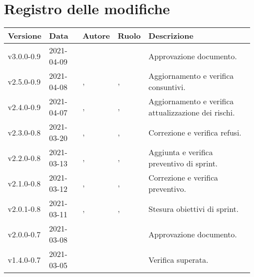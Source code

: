 \section*{\hfil Registro delle modifiche \hfil}
{
	\newlength{\freewidth}
	\setlength{\freewidth}{\dimexpr\textwidth-10\tabcolsep}
	\renewcommand{\arraystretch}{1.5}
	\centering
	\setlength{\aboverulesep}{0pt}
	\setlength{\belowrulesep}{0pt}
	\begin{longtable}{C{.131777\freewidth} C{.134036\freewidth} C{.263554\freewidth} C{.188254\freewidth} C{.282379\freewidth}}
		\toprule 
		\textbf{Versione} & \textbf{Data} & \textbf{Autore} & \textbf{Ruolo} & \textbf{Descrizione}\\
		\toprule
		\endhead
		v3.0.0-0.9 & 2021-04-09 & \Tommaso{} & \RdP{} & Approvazione documento. \\
		v2.5.0-0.9 & 2021-04-08 & \Daniele{}, \newline{} \Davide{} & \ver{},\newline{} \progr{} & Aggiornamento e verifica consuntivi. \\
		v2.4.0-0.9 & 2021-04-07 & \Lucrezia{}, \newline{} \Davide{} & \ver{},\newline{} \progr{} & Aggiornamento e verifica attualizzazione dei rischi. \\
		v2.3.0-0.8 & 2021-03-20 & \Giosue{}, \newline{} \Francesco{} & \ver{}, \newline{} \prog{} & Correzione e verifica refusi. \\
		v2.2.0-0.8 & 2021-03-13 & \Daniele{}, \newline{} \Davide{} & \ver{},\newline{} \progr{} & Aggiunta e verifica preventivo di sprint. \\
		v2.1.0-0.8 & 2021-03-12 & \Lucrezia{},\newline{} \Matteo{} & \ver{},\newline{} \prog{} & Correzione e verifica preventivo. \\
		v2.0.1-0.8 & 2021-03-11 & \Daniele{},\newline{} \Davide{} & \ver{},\newline{} \progr{} & Stesura obiettivi di sprint. \\
		v2.0.0-0.7 & 2021-03-08 & \Matteo{} & \RdP{} & Approvazione documento. \\
		v1.4.0-0.7 & 2021-03-05 & \Davide{} & \ver{} & Verifica superata. \\

\end{longtable}}
